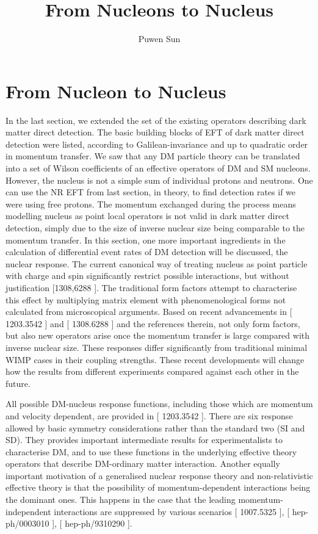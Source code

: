 \documentclass[12pt]{article}
\begin{document}
\title{From Nucleons to Nucleus}
\author{Puwen Sun}
\date{}
\maketitle


\section{From Nucleon to Nucleus}

In the last section, we extended the set of the existing operators describing dark matter direct detection. The basic building blocks of EFT of dark matter direct detection were listed, according to Galilean-invariance and up to quadratic order in momentum transfer. We saw that any DM particle theory can be translated into a set of Wilson coefficients of an effective operators of DM and SM nucleons. However, the nucleus is not a simple sum of individual protons and neutrons. One can use the NR EFT from last section, in theory, to find detection rates if we were using free protons. The momentum exchanged during the process means modelling nucleus as point local operators is not valid in dark matter direct detection, simply due to the size of inverse nuclear size being comparable to the momentum transfer.  In this section, one more important ingredients in the calculation of differential event rates of DM detection will be discussed, the nuclear response. The current canonical way of treating nucleus as point particle with charge and spin significantly restrict possible interactions, but without justification [1308,6288 ]. The traditional form factors attempt to characterise this effect by multiplying matrix element with phenomenological forms not calculated from microscopical arguments.  Based on recent advancements in [ 1203.3542 ] and [ 1308.6288 ] and the references therein, not only form factors, but also new operators arise once the momentum transfer is large compared with inverse nuclear size. These responses differ significantly from traditional minimal WIMP cases in their coupling strengths. These recent developments will change how the results from different experiments compared against each other in the future. 

All possible DM-nucleus response functions, including those which are momentum and velocity dependent, are provided in [ 1203.3542 ]. There are six response allowed by basic symmetry considerations rather than the standard two (SI and SD). They provides important intermediate results for experimentalists to characterise DM, and to use these functions in the underlying effective theory operators that describe DM-ordinary matter interaction. Another equally important motivation of a generalised nuclear response theory and non-relativistic effective theory is that the possibility of momentum-dependent interactions being the dominant ones. This happens in the case that the leading momentum-independent interactions are suppressed by various scenarios [ 1007.5325 ], [ hep-ph/0003010 ], [ hep-ph/9310290 ]. 
\end{document}
